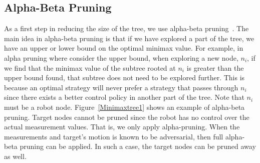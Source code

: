 \documentclass[journal]{IEEEtran}
\begin{document}
\subsection{Alpha-Beta Pruning}
As a first step in reducing the size of the tree, we use alpha-beta pruning~\cite{russell2009artificial}. The main idea in alpha-beta  pruning is that if we have explored a part of the tree, we have an upper or lower bound on the optimal minimax value. For example, in alpha pruning where consider the upper bound, when exploring a new node, $n_i$, if we find that the minimax value of the subtree rooted at $n_i$ is greater than the upper bound found, that subtree does not need to be explored further. This is because an optimal strategy will never prefer a strategy that passes through $n_i$ since there exists a better control policy in another part of the tree. Note that $n_i$ must be a robot node. Figure~\ref{Minimaxtree1} shows an example of alpha-beta pruning. Target nodes cannot be pruned since the robot has no control over the actual measurement values. That is, we only apply alpha-pruning. When the measurements and target's motion is known to be adversarial, then full alpha-beta pruning can be applied. In such a case, the target nodes can be pruned away as well.
\end{document}
